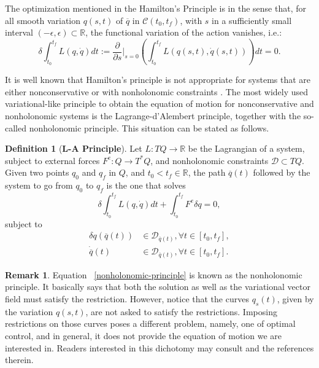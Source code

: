 \documentclass{aims}
\numberwithin{equation}{section}
\theoremstyle{definition}
\newtheorem{definition}[theorem]{Definition}
\newtheorem{remark}[theorem]{Remark}
\begin{document}
The optimization mentioned in the Hamilton's Principle is in the sense that, for all smooth variation $q(s, t)$ of $\overline{q}$ in $\mathcal{C}(t_0, t_f)$, with $s$ in a sufficiently small interval $(-\epsilon, \epsilon)\subset \mathbb{R}$, the functional variation of the action vanishes, i.e.:
\[\delta\int_{t_0}^{t_f}L(q, \dot{q})dt := \frac{\partial}{\partial s}\bigg|_{s=0}\left(\int_{t_0}^{t_f}L(q(s, t), \dot{q}(s, t))\right)dt = 0.\]

It is well known that Hamilton's principle is not appropriate for systems that are either nonconservative or with nonholonomic constraints \cite{bloch2015nonholonomic, cortes2002non}. The most widely used variational-like principle to obtain the equation of motion for nonconservative and nonholonomic systems is the Lagrange-d'Alembert principle, together with the so-called nonholonomic principle. This situation can be stated as follows.

\begin{definition}[{\bf L-A Principle}]
Let $L\colon TQ\to \mathbb{R}$ be the Lagrangian of a system, subject to external forces $F^e\colon Q\to T^*Q$, and nonholonomic constraints ${\mathcal D}\subset TQ$. Given two points $q_0$ and $q_f$ in $Q$, and $t_0< t_f\in \mathbb{R}$, the path $\overline{q}(t)$ followed by the system to go from $q_0$ to $q_f$ is the one that solves
\begin{equation}\label{LA-principle}
    \delta\int_{t_0}^{t_f}L(q, \dot{q})dt + \int_{t_0}^{t_f}F^e \delta q = 0,
\end{equation}
subject to
\begin{equation}\label{nonholonomic-principle}
    \begin{split}
        \delta q(\overline{q}(t))& \in {\mathcal D}_{\overline{q}(t)}, \forall t\in[t_0,t_f],\\
        \dot{\overline{q}}(t)&\in {\mathcal D}_{\overline{q}(t)}, \forall t\in[t_0, t_f].
    \end{split}
\end{equation}
\end{definition}

\begin{remark}
Equation ~\eqref{nonholonomic-principle} is known as the nonholonomic principle. It basically says that both the solution as well as the variational vector field must satisfy the restriction. However, notice that the curves $q_s(t)$, given by the variation $q(s, t)$, are not asked to satisfy the restrictions. Imposing restrictions on those curves poses a different problem, namely, one of optimal control, and in general, it does not provide the equation of motion we are interested in. Readers interested in this dichotomy may consult \cite{bloch2015nonholonomic} and the references therein. 
\end{remark}
\end{document}
